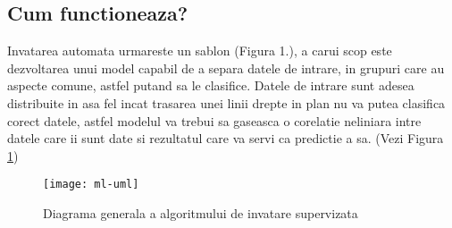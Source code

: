 	
	\subsection{Cum functioneaza?}
	Invatarea automata urmareste un sablon (Figura 1.), a carui scop este dezvoltarea unui model capabil de a separa datele de intrare, in grupuri care au aspecte comune, astfel putand sa le clasifice. Datele de intrare sunt adesea distribuite in asa fel incat trasarea unei linii drepte in plan nu va putea clasifica corect datele, astfel  modelul va trebui sa gaseasca o corelatie neliniara intre datele care ii sunt date si rezultatul care va servi ca predictie a sa. (Vezi Figura \ref{fig:uml-diagram})
	
	\vfill
	
	\begin{figure}[H]
		\texttt{[image: ml-uml]}  
		\caption{\label{fig:uml-diagram} Diagrama generala a algoritmului de invatare supervizata \cite{predictive_modelling}}
	\end{figure}
	
